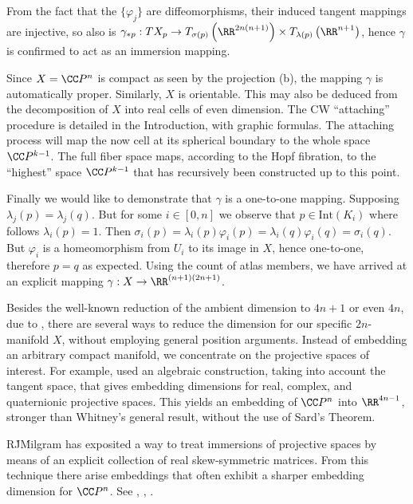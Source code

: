 From the fact that the $\{\varphi_j\}$ are diffeomorphisms, their induced tangent mappings are injective, so also is $\gamma_{* p}: TX_p \to T_{\sigma(p)} \left(\RR^{2n(n+1)}\right) \times T_{\lambda(p)}\left(\RR^{n+1}\right)$, hence $\gamma$ is confirmed to act as an immersion mapping.

Since $X = \CC  P^n$ is compact as seen by the projection (b), the mapping $\gamma$ is automatically proper.
Similarly, $X$ is orientable. This may also be deduced from the decomposition of $X$ into real cells of even dimension. The CW ``attaching'' procedure is detailed in the Introduction, with graphic formulas. The attaching process will map the now cell at its spherical boundary to the whole space $\CC P^{k-1}$.
The full fiber space maps, according to the Hopf fibration, to the ``highest'' space $\CC P^{k-1}$ that has recursively been constructed up to this point.

Finally we would like to demonstrate that $\gamma$ is a one-to-one mapping. Supposing $\lambda_j (p) = \lambda_j(q)$. But for some $i \in [0, n]$ we observe that $p \in \mbox{Int}(K_i)$ where follows $\lambda_i (p) = 1$.
Then $\sigma_i (p) = \lambda_i(p) \varphi_i(p) = \lambda_i (q) \varphi_i (q) = \sigma_i (q)$. But $\varphi_i$ is a homeomorphism from $U_i$ to its image in $X$, hence one-to-one, therefore $p=q$ as expected.
Using the count of atlas members, we have arrived at an explicit mapping $\gamma : X \to \RR^{(n+1)(2n+1)}$.

Besides the well-known reduction of the ambient dimension to $4n+1$ or even $4n$, due to \cite{Whitney}, there are several ways to reduce the dimension for our specific $2n$-manifold $X$, without employing general position arguments. Instead of embedding an arbitrary compact manifold, we concentrate on the projective spaces of interest.
For example, \cite{James} used an algebraic construction, taking into account the tangent space, that gives embedding dimensions for real, complex, and quaternionic projective spaces. This yields an embedding of $\CC P^n$ into $\RR^{4n-1}$, stronger than Whitney's general result, without the use of Sard's Theorem.

R\. J\. Milgram has exposited a way to treat immersions of projective spaces by means of an explicit collection of real skew-symmetric matrices. From this technique there arise embeddings that often exhibit a sharper embedding dimension for $\CC P^n$. See \cite{Mukherjee}, \cite{Steer}, \cite{Milgram}.


